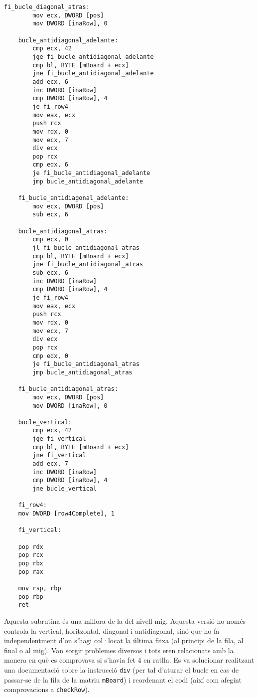 \documentclass[a4paper,12pt]{article}
\begin{document}
\begin{lstlisting}[firstnumber=524]
    fi_bucle_diagonal_atras:
        mov ecx, DWORD [pos]  
        mov DWORD [inaRow], 0
        
    bucle_antidiagonal_adelante:
		cmp ecx, 42  
        jge fi_bucle_antidiagonal_adelante
		cmp bl, BYTE [mBoard + ecx]
        jne fi_bucle_antidiagonal_adelante
        add ecx, 6  
        inc DWORD [inaRow]  
        cmp DWORD [inaRow], 4
        je fi_row4 
        mov eax, ecx
        push rcx
        mov rdx, 0
        mov ecx, 7
        div ecx 
        pop rcx
        cmp edx, 6
        je fi_bucle_antidiagonal_adelante
        jmp bucle_antidiagonal_adelante

    fi_bucle_antidiagonal_adelante:
        mov ecx, DWORD [pos]  
        sub ecx, 6 

    bucle_antidiagonal_atras:
        cmp ecx, 0 
        jl fi_bucle_antidiagonal_atras
        cmp bl, BYTE [mBoard + ecx]
        jne fi_bucle_antidiagonal_atras
        sub ecx, 6  
        inc DWORD [inaRow]  
        cmp DWORD [inaRow], 4
        je fi_row4 
        mov eax, ecx
        push rcx
        mov rdx, 0
        mov ecx, 7
        div ecx 
        pop rcx
        cmp edx, 0
        je fi_bucle_antidiagonal_atras
        jmp bucle_antidiagonal_atras

    fi_bucle_antidiagonal_atras:
        mov ecx, DWORD [pos]  
        mov DWORD [inaRow], 0

    bucle_vertical:
        cmp ecx, 42  
        jge fi_vertical
        cmp bl, BYTE [mBoard + ecx]
        jne fi_vertical
        add ecx, 7  
        inc DWORD [inaRow]  
        cmp DWORD [inaRow], 4
        jne bucle_vertical

    fi_row4:
    mov DWORD [row4Complete], 1  
    
    fi_vertical:

    pop rdx
    pop rcx
    pop rbx
    pop rax

	mov rsp, rbp
	pop rbp
	ret
\end{lstlisting}
Aquesta subrutina és una millora de la del nivell mig. Aquesta versió no només controla la vertical, horitzontal, diagonal i antidiagonal, sinó que ho fa independentment d'on s'hagi col·locat la última fitxa (al principi de la fila, al final o al mig). Van sorgir problemes diversos i tots eren relacionats amb la manera en què es comprovava si s'havia fet 4 en ratlla. Es va solucionar realitzant una documentació sobre la instrucció \lstinline|div| (per tal d'aturar el bucle en cas de passar-se de la fila de la matriu \lstinline|mBoard|) i reordenant el codi (així com afegint comprovacions a \lstinline|checkRow|).
\end{document}
